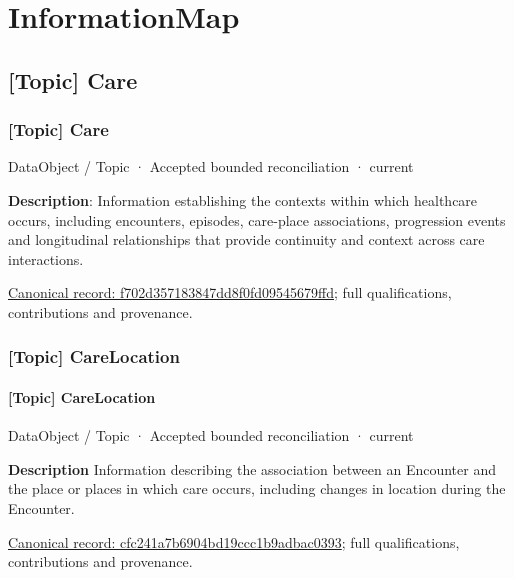 \chapter{InformationMap}

\section{[Topic] Care}

\subsection{[Topic] Care}

\label{element:f702d357183847dd8f0fd09545679ffd}
{\small DataObject / Topic · Accepted bounded reconciliation · current}\par

\textbf{Description}: Information establishing the contexts within which healthcare occurs, including encounters, episodes, care-place associations, progression events and longitudinal relationships that provide continuity and context across care interactions.


{\footnotesize \href{../../../../continuum/application/data-object/topic/f702d357183847dd8f0fd09545679ffd.md}{Canonical record: f702d357183847dd8f0fd09545679ffd}; full qualifications, contributions and provenance.}\par
\subsection{[Topic] CareLocation}

\subsubsection{[Topic] CareLocation}

\label{element:cfc241a7b6904bd19ccc1b9adbac0393}
{\small DataObject / Topic · Accepted bounded reconciliation · current}\par

\textbf{Description}
Information describing the association between an Encounter and the place or places in which care occurs, including changes in location during the Encounter.


{\footnotesize \href{../../../../continuum/application/data-object/topic/cfc241a7b6904bd19ccc1b9adbac0393.md}{Canonical record: cfc241a7b6904bd19ccc1b9adbac0393}; full qualifications, contributions and provenance.}\par
